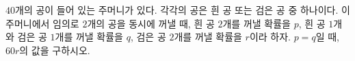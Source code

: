 $40$개의 공이 들어 있는 주머니가 있다. 각각의 공은 흰 공 또는 검은 공 중 하나이다. 이 주머니에서 임의로 $2$개의 공을 동시에 꺼낼 때, 흰 공 $2$개를 꺼낼 확률을 $p$, 흰 공 $1$개와 검은 공 $1$개를 꺼낼 확률을 $q$, 검은 공 $2$개를 꺼낼 확률을 $r$이라 하자. $p=q$일 때, $60r$의 값을 구하시오. 
